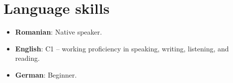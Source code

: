 \documentclass[a4paper,11pt]{article}
\newcommand{\resumeItem}[2]{
  \item\small{
    \textbf{#1}{: #2 \vspace{-2pt}}
  }
}
\newcommand{\resumeSubItem}[2]{\resumeItem{#1}{#2}\vspace{-4pt}}
\newcommand{\resumeSubHeadingListStart}{\begin{itemize}[leftmargin=*]}
\newcommand{\resumeSubHeadingListEnd}{\end{itemize}}
\begin{document}
\section{Language skills}
  \resumeSubHeadingListStart
    \resumeSubItem{Romanian}
      {Native speaker.}
    \resumeSubItem{English}
      {C1 -- working proficiency in speaking,
      writing, listening, and reading.}
    \resumeSubItem{German}
      {Beginner.}
  \resumeSubHeadingListEnd


\end{document}
